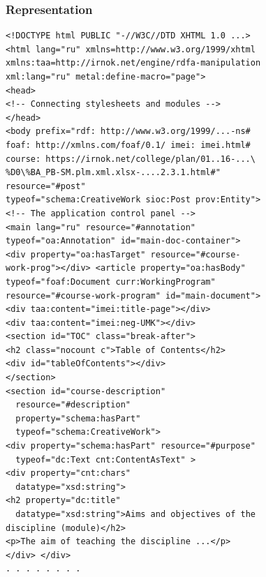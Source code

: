 \documentclass[10pt]{beamer}
\begin{document}
\begin{frame}
  \frametitle{Representation}

\begin{verbatim}
<!DOCTYPE html PUBLIC "-//W3C//DTD XHTML 1.0 ...>
<html lang="ru" xmlns=http://www.w3.org/1999/xhtml
xmlns:taa=http://irnok.net/engine/rdfa-manipulation
xml:lang="ru" metal:define-macro="page">
<head>
<!-- Connecting stylesheets and modules -->
</head>
<body prefix="rdf: http://www.w3.org/1999/...-ns#
foaf: http://xmlns.com/foaf/0.1/ imei: imei.html#
course: https://irnok.net/college/plan/01..16-...\
%D0\%BA_PB-SM.plm.xml.xlsx-....2.3.1.html#"
resource="#post"
typeof="schema:CreativeWork sioc:Post prov:Entity">
<!-- The application control panel -->
<main lang="ru" resource="#annotation"
typeof="oa:Annotation" id="main-doc-container">
<div property="oa:hasTarget" resource="#course-
work-prog"></div> <article property="oa:hasBody"
typeof="foaf:Document curr:WorkingProgram"
resource="#course-work-program" id="main-document">
<div taa:content="imei:title-page"></div>
<div taa:content="imei:neg-UMK"></div>
<section id="TOC" class="break-after">
<h2 class="nocount c">Table of Contents</h2>
<div id="tableOfContents"></div>
</section>
<section id="course-description"
  resource="#description"
  property="schema:hasPart"
  typeof="schema:CreativeWork">
<div property="schema:hasPart" resource="#purpose"
  typeof="dc:Text cnt:ContentAsText" >
<div property="cnt:chars"
  datatype="xsd:string">
<h2 property="dc:title"
  datatype="xsd:string">Aims and objectives of the
discipline (module)</h2>
<p>The aim of teaching the discipline ...</p>
</div> </div>
. . . . . . . .
\end{verbatim}
\end{frame}
\end{document}
